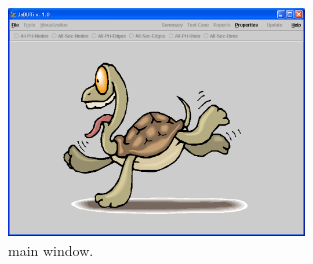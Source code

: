 \begin{figure}[!ht]
\begin{center}
\includegraphics[width=0.70\textwidth]{fig/initial-screen}
\caption{\label{fig:jabuti-initial}\toolname main window.}
\end{center}
\end{figure}
